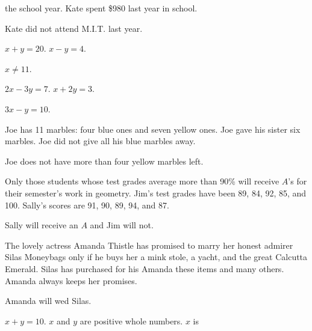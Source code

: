 \documentclass[11pt]{book}
\begin{document}
\begin{exercisecols}
\begin{exlist}
\begin{hyp}
      the school year. Kate spent \$980 last year in school.\end{hyp}
      \begin{thmclaim}Kate did not attend M.I.T. last year.\end{thmclaim}
\item \begin{hyp}$x + y = 20$. $x - y = 4$.\end{hyp}
      \begin{thmclaim}$x \neq 11$.\end{thmclaim}
\item \begin{hyp}$2x - 3y = 7$. $x + 2y = 3$.\end{hyp}
      \begin{thmclaim}$3x - y = 10$.\end{thmclaim}
\item \begin{hyp}Joe has 11 marbles: four blue ones and seven yellow ones. Joe
      gave his sister six marbles. Joe did not give all his blue marbles
      away.\end{hyp}
      \begin{thmclaim}Joe does not have more than four yellow marbles
      left.\end{thmclaim}
\item \begin{hyp}Only those students whose test grades average more than 90\% will
      receive $A$'s for their semester's work in geometry. Jim's test grades have
      been 89, 84, 92, 85, and 100. Sally's scores are 91, 90, 89, 94, and
      87.\end{hyp}
      \begin{thmclaim}Sally will receive an $A$ and Jim will not.\end{thmclaim}
\item \begin{hyp}The lovely actress Amanda Thistle has promised to marry her
      honest admirer Silas Moneybags only if he buys her a mink stole, a yacht,
      and the great Calcutta Emerald. Silas has purchased for his Amanda these
      items and many others. Amanda always keeps her promises.\end{hyp}
      \begin{thmclaim}Amanda will wed Silas.\end{thmclaim}
\item \begin{hyp}$x + y = 10$. $x$ and $y$ are positive whole numbers. $x$ is

\end{hyp}
\end{exlist}
\end{exercisecols}
\end{document}
